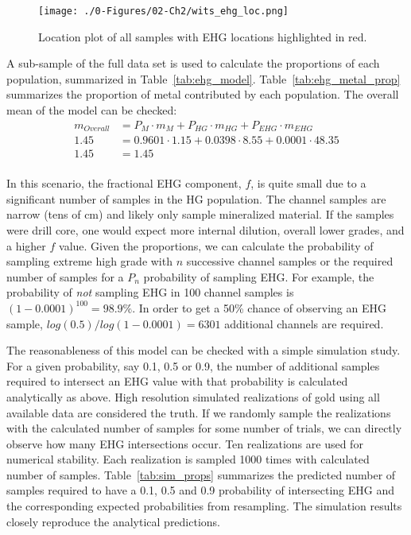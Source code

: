 \begin{figure}[htb!]
    \centering
    \texttt{[image: ./0-Figures/02-Ch2/wits\_ehg\_loc.png]}
    \caption{Location plot of all samples with EHG locations highlighted in red.}
    \label{fig:wits_ehg_loc}
\end{figure}

A sub-sample of the full data set is used to calculate the proportions of each population, summarized in Table~\ref{tab:ehg_model}. Table~\ref{tab:ehg_metal_prop} summarizes the proportion of metal contributed by each population. The overall mean of the model can be checked:
\begin{align*}
    m_{Overall} & = P_{M} \cdot m_{M}  + P_{HG} \cdot m_{HG} + P_{EHG} \cdot m_{EHG} \\
    1.45        & = 0.9601 \cdot 1.15 + 0.0398 \cdot 8.55 + 0.0001 \cdot 48.35       \\
    1.45        & = 1.45                                                             \\
\end{align*}



In this scenario, the fractional EHG component, $f$, is quite small due to a significant number of samples in the HG population. The channel samples are narrow (tens of cm) and likely only sample mineralized material. If the samples were drill core, one would expect more internal dilution, overall lower grades, and a higher $f$ value. Given the proportions, we can calculate the probability of sampling extreme high grade with $n$ successive channel samples or the required number of samples for a $P_n$ probability of sampling EHG. For example, the probability of \emph{not} sampling EHG in 100 channel samples is $(1-0.0001)^{100} = 98.9\%$. In order to get a 50\% chance of observing an EHG sample, $log(0.5)/log(1-0.0001) = 6301$ additional channels are required.

The reasonableness of this model can be checked with a simple simulation study. For a given probability, say 0.1, 0.5 or 0.9, the number of additional samples required to intersect an EHG value with that probability is calculated analytically as above. High resolution simulated realizations of gold using all available data are considered the truth. If we randomly sample the realizations with the calculated number of samples for some number of trials, we can directly observe how many EHG intersections occur. Ten realizations are used for numerical stability. Each realization is sampled 1000 times with calculated number of samples. Table~\ref{tab:sim_props} summarizes the predicted number of samples required to have a 0.1, 0.5 and 0.9 probability of intersecting EHG and the corresponding expected probabilities from resampling. The simulation results closely reproduce the analytical predictions.

